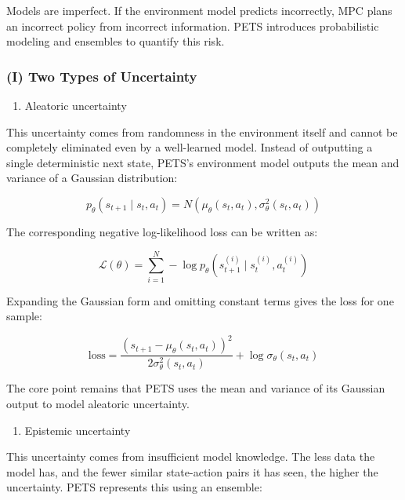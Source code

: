 Models are imperfect. If the environment model predicts incorrectly, MPC plans an incorrect policy from incorrect information. PETS introduces probabilistic modeling and ensembles to quantify this risk.

\hypertarget{i-two-types-of-uncertainty}{%
\subsubsection{(I) Two Types of Uncertainty}\label{i-two-types-of-uncertainty}}

\begin{enumerate}
\def\labelenumi{\arabic{enumi}.}
\tightlist
\item
  Aleatoric uncertainty
\end{enumerate}

This uncertainty comes from randomness in the environment itself and cannot be completely eliminated even by a well-learned model. Instead of outputting a single deterministic next state, PETS's environment model outputs the mean and variance of a Gaussian distribution:

\[
p_\theta(s_{t+1}\mid s_t,a_t)=N(\mu_\theta(s_t,a_t),\sigma_\theta^2(s_t,a_t))
\]

The corresponding negative log-likelihood loss can be written as:

\[
\mathcal L(\theta)=\sum_{i=1}^{N}-\log p_\theta(s_{t+1}^{(i)}\mid s_t^{(i)},a_t^{(i)})
\]

Expanding the Gaussian form and omitting constant terms gives the loss for one sample:

\[
\mathrm{loss}
=\frac{(s_{t+1}-\mu_\theta(s_t,a_t))^2}{2\sigma_\theta^2(s_t,a_t)}
+\log\sigma_\theta(s_t,a_t)
\]

The core point remains that PETS uses the mean and variance of its Gaussian output to model aleatoric uncertainty.

\begin{enumerate}
\def\labelenumi{\arabic{enumi}.}
\setcounter{enumi}{1}
\tightlist
\item
  Epistemic uncertainty
\end{enumerate}

This uncertainty comes from insufficient model knowledge. The less data the model has, and the fewer similar state-action pairs it has seen, the higher the uncertainty. PETS represents this using an ensemble:

